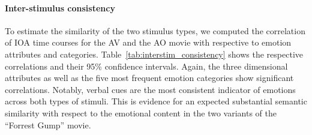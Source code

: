 \documentclass[10pt,a4paper,twocolumn]{article}
\begin{document}
\paragraph{Inter-stimulus consistency}

To estimate the similarity of the two stimulus types, we computed the
correlation of IOA time courses for the AV and the AO movie with respective to
emotion attributes and categories. Table~\ref{tab:interstim_consistency} shows
the respective correlations and their 95\% confidence intervals. Again, the
three dimensional attributes as well as the five most frequent emotion
categories show significant correlations. Notably, verbal cues are the most
consistent indicator of emotions across both types of stimuli.
This is evidence for an expected
substantial semantic similarity with respect to the emotional content in the
two variants of the ``Forrest Gump'' movie.
\end{document}
